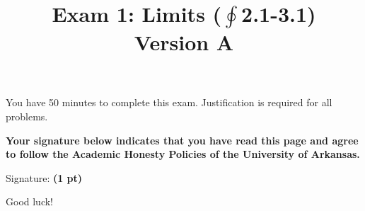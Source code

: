 \documentclass[12pt]{article}
\title{\vspace{-8pc}
\vfill{\Huge
	\bf Exam 1: Limits ($\textstyle\oint$2.1-3.1)} \\
	Version A}
\author{}
\date{}
\begin{document}
\maketitle
\vspace{-3pc}
 You have 50 minutes to complete this exam.  Justification is required for all problems. 

\vspace{2pc}
\noindent\textbf{Your signature below indicates that you have read this page and agree to follow the Academic Honesty Policies of the University of Arkansas.}  

\vfill
\noindent Signature: {\bf (1 pt)} \underline{\hspace{73ex}}
\begin{flushright}\Large Good luck!\end{flushright}
\end{document}
